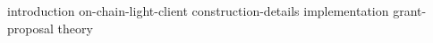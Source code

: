 {introduction}
{on-chain-light-client}
{construction-details}
{implementation}
{grant-proposal}
{theory}




